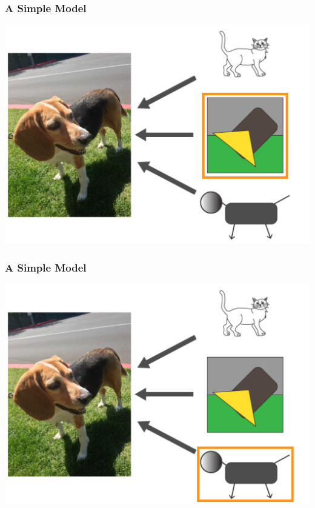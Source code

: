 \documentclass[12pt, block=fill]{beamer}
\begin{document}
\begin{frame}
  \frametitle{A Simple Model}
  \begin{center}
    \includegraphics[width=0.9\linewidth]{figures/model_c2.png}     
  \end{center}
\end{frame}

\begin{frame}
  \frametitle{A Simple Model}
  \begin{center}
    \includegraphics[width=0.9\linewidth]{figures/model_c3.png}     
  \end{center}
\end{frame}
\end{document}
